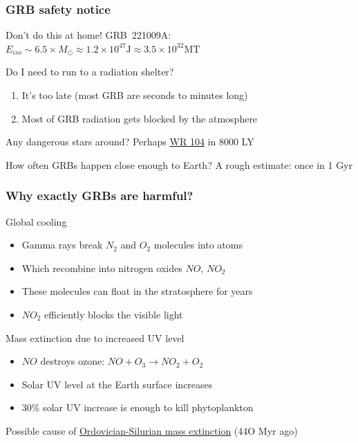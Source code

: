 \documentclass[aspectratio=169]{beamer}
\begin{document}
\begin{frame}
\frametitle{GRB safety notice}
\begin{block}{Don't do this at home!}
GRB~221009A: $E_{iso} \sim 6.5 \times M_\odot \approx 1.2 \times 10^{47} \mathrm{J} \approx 3.5 \times 10^{32} \mathrm{MT}$  \cite{arXiv:2302.13383}
\end{block}

\begin{block}{Do I need to run to a radiation shelter?}
\begin{enumerate}
\item It's too late (most GRB are seconds to minutes long)
\item Most of GRB radiation gets blocked by the atmosphere
\end{enumerate}
\end{block}

\begin{block}{Any dangerous stars around?}
Perhaps \href{https://en.wikipedia.org/wiki/WR_104}{WR 104} in 8000 LY
\end{block}

\begin{block}{How often GRBs happen close enough to Earth?}
A rough estimate: once in 1 Gyr
\end{block}
\end{frame}

\begin{frame}
\frametitle{Why exactly GRBs are harmful?}
\begin{block}{Global cooling}
\begin{itemize}
\item Gamma rays break $N_2$ and $O_2$ molecules into atoms
\item Which recombine into nitrogen oxides $NO$, $NO_2$
\item These molecules can float in the stratosphere for years
\item $NO_2$ efficiently blocks the visible light
\end{itemize}
\end{block}

\begin{block}{Mass extinction due to increased UV level}
\begin{itemize}
\item $NO$ destroys ozone: $NO + O_3 \to NO_2 + O_2$
\item Solar UV level at the Earth surface increases
\item 30\% solar UV increase is enough to kill phytoplankton 
\end{itemize}
Possible cause of \href{http://en.wikipedia.org/wiki/Ordovician\%E2\%80\%93Silurian_extinction_events}{Ordovician-Silurian mass extinction}
(44O Myr ago) \cite{arXiv:astro-ph/0309415}
\end{block}
\end{frame}
\end{document}
